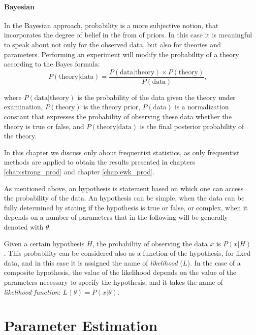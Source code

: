 \paragraph{Bayesian}

In the Bayesian approach, probability is a more subjective notion, that incorporates the degree of belief in the from of priors. In this case it is meaningful to speak about \pdf not only for the observed data, but also for theories and parameters. Performing an experiment will modify the probability of a theory according to the Bayes formula:
\begin{equation}
P(\mathrm{theory} | \mathrm{data}) = \frac{ P(\mathrm{data}|\mathrm{theory}) \times P(\mathrm{theory})}{P(\mathrm{data})},
\end{equation}

\noindent where $P(\mathrm{data}|\mathrm{theory})$ is the probability of the data given the theory under examination, $P(\mathrm{theory})$ is the theory prior, $P(\mathrm{data})$ is a normalization constant that expresses the probability of observing these data whether the theory is true or false, and $P(\mathrm{theory} | \mathrm{data})$ is the final posterior probability of the theory.

In this chapter we discuss only about frequentist statistics, as only frequentist methods are applied to obtain the results presented in chapters \ref{chap:strong_prod} and chapter \ref{chap:ewk_prod}. 

As mentioned above, an hypothesis is statement based on which one can access the probability of the data. An hypothesis can be simple, when the data \pdf can be fully determined by stating if the hypothesis is true or false, or complex, when it depends on a number of parameters that in the following will be generally denoted with $\theta$. 

Given a certain hypothesis $H$, the probability of observing the data $x$ is $P(x|H)$. This probability can be considered also as a function of the hypothesis, for fixed data, and in this case it is assigned the name of \textit{likelihood} ($L$). In the case of a composite hypothesis, the value of the likelihood depends on the value of the parameters necessary to specify the hypothesis, and it takes the name of \textit{likelihood function}: $L(\theta)=P(x|\theta)$.

\section{Parameter Estimation}
\label{sec:stat:pe}

